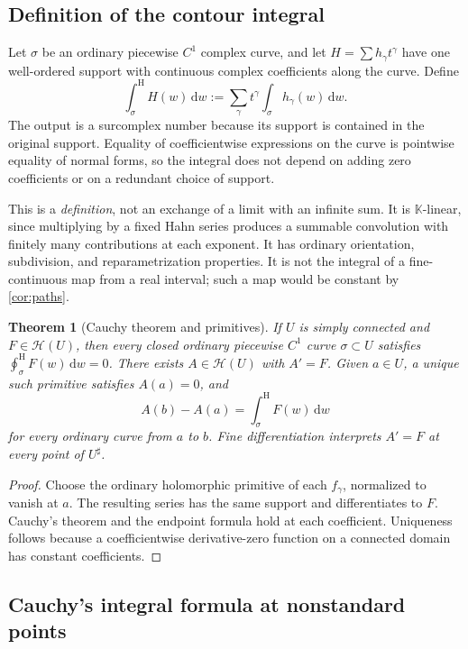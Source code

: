 \documentclass[11pt,letterpaper]{article}
\numberwithin{equation}{section}
\newtheorem{theorem}{Theorem}[section]
\theoremstyle{definition}
\theoremstyle{remark}
\newcommand{\K}{\mathbb{K}}
\newcommand{\HH}{\mathcal{H}}
\newcommand{\dd}{\,\mathrm{d}}
\newcommand{\cint}{\mathop{\int}\nolimits^{\mathrm H}}
\newcommand{\cooint}{\mathop{\oint}\nolimits^{\mathrm H}}
\begin{document}
\subsection{Definition of the contour integral}

Let $\sigma$ be an ordinary piecewise $C^1$ complex curve, and let
$H=\sum h_\gamma t^\gamma$ have one well-ordered support with continuous
complex coefficients along the curve. Define
\begin{equation}\label{eq:contourdefinition}
 \cint_\sigma H(w)\dd w
 :=\sum_\gamma t^\gamma\int_\sigma h_\gamma(w)\dd w.
\end{equation}
The output is a surcomplex number because its support is contained in the
original support. Equality of coefficientwise expressions on the curve is
pointwise equality of normal forms, so the integral does not depend on adding
zero coefficients or on a redundant choice of support.

This is a \emph{definition}, not an exchange of a limit with an infinite sum.
It is $\K$-linear, since multiplying by a fixed Hahn series produces a
summable convolution with finitely many contributions at each exponent.
It has ordinary orientation, subdivision, and reparametrization properties.
It is not the integral of a fine-continuous map from a real interval; such a
map would be constant by \cref{cor:paths}.

\begin{theorem}[Cauchy theorem and primitives]\label{thm:cauchytheorem}
If $U$ is simply connected and $F\in\HH(U)$, then every closed ordinary
piecewise $C^1$ curve $\sigma\subset U$ satisfies
$\cooint_\sigma F(w)\dd w=0$.
There exists $A\in\HH(U)$ with $A'=F$. Given $a\in U$, a unique such
primitive satisfies $A(a)=0$, and
\[
 A(b)-A(a)=\cint_\sigma F(w)\dd w
\]
for every ordinary curve from $a$ to $b$. Fine differentiation interprets
$A'=F$ at every point of $U^\sharp$.
\end{theorem}
\begin{proof}
Choose the ordinary holomorphic primitive of each $f_\gamma$, normalized to
vanish at $a$. The resulting series has the same support and differentiates
to $F$. Cauchy's theorem and the endpoint formula hold at each coefficient.
Uniqueness follows because a coefficientwise derivative-zero function on a
connected domain has constant coefficients.
\end{proof}

\subsection{Cauchy's integral formula at nonstandard points}
\end{document}
